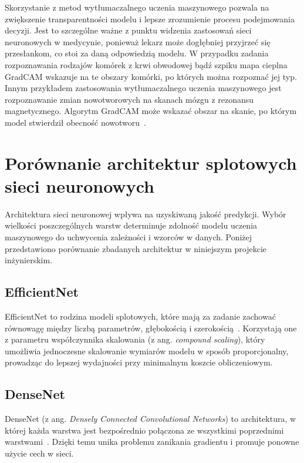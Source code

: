 Skorzystanie z metod wytłumaczalnego uczenia maszynowego pozwala na zwiększenie transparentności modelu i lepsze zrozumienie procesu podejmowania decyzji.
Jest to szczególne ważne z punktu widzenia zastosowań sieci neuronowych w medycynie, ponieważ lekarz może dogłębniej przyjrzeć się przesłankom, co stoi za daną odpowiedzią modelu.
W przypadku zadania rozpoznawania rodzajów komórek z krwi obwodowej bądź szpiku mapa cieplna GradCAM wskazuje na te obszary komórki, po których można rozpoznać jej typ.
Innym przykładem zastosowania wytłumaczalnego uczenia maszynowego jest rozpoznawanie zmian nowotworowych na skanach mózgu z rezonansu magnetycznego.
Algorytm GradCAM może wskazać obszar na skanie, po którym model stwierdził obecność nowotworu~\cite{gradcam_brain_tumor}.

\section{Porównanie architektur splotowych sieci neuronowych}

Architektura sieci neuronowej wpływa na uzyskiwaną jakość predykcji.
Wybór wielkości poszczególnych warstw determinuje zdolność modelu uczenia maszynowego do uchwycenia zależności i wzorców w danych.
Poniżej przedstawiono porównanie zbadanych architektur w niniejszym projekcie inżynierskim.

\subsection{EfficientNet}

EfficientNet to rodzina modeli splotowych, które mają za zadanie zachować równowagę między liczbą parametrów, głębokością i szerokością~\cite{efficientnet}.
Korzystają one z parametru współczynnika skalowania (z ang. \textit{compound scaling}),
który umożliwia jednoczesne skalowanie wymiarów modelu w sposób proporcjonalny, prowadząc do lepszej wydajności przy minimalnym koszcie obliczeniowym.

\subsection{DenseNet}

DenseNet (z ang. \textit{Densely Connected Convolutional Networks}) to architektura,
w której każda warstwa jest bezpośrednio połączona ze wszystkimi poprzednimi warstwami~\cite{densenet}.
Dzięki temu unika problemu zanikania gradientu i promuje ponowne użycie cech w sieci.

